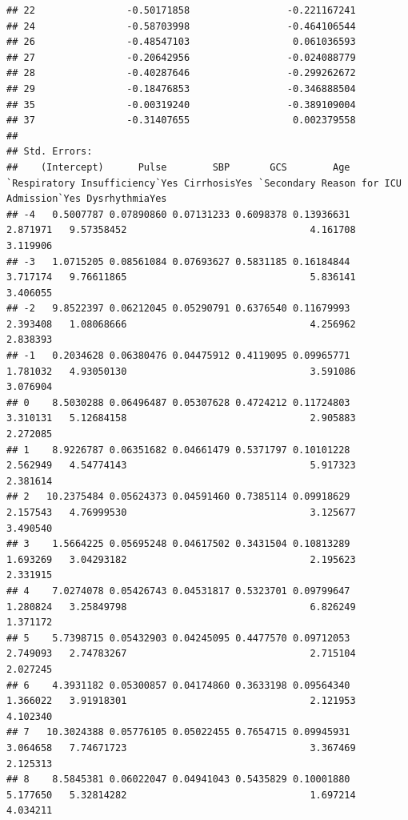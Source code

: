 \documentclass[
]{article}
\begin{document}
\begin{verbatim}
## 22                -0.50171858                 -0.221167241
## 24                -0.58703998                 -0.464106544
## 26                -0.48547103                  0.061036593
## 27                -0.20642956                 -0.024088779
## 28                -0.40287646                 -0.299262672
## 29                -0.18476853                 -0.346888504
## 35                -0.00319240                 -0.389109004
## 37                -0.31407655                  0.002379558
## 
## Std. Errors:
##    (Intercept)      Pulse        SBP       GCS        Age `Respiratory Insufficiency`Yes CirrhosisYes `Secondary Reason for ICU Admission`Yes DysrhythmiaYes
## -4   0.5007787 0.07890860 0.07131233 0.6098378 0.13936631                       2.871971   9.57358452                                4.161708       3.119906
## -3   1.0715205 0.08561084 0.07693627 0.5831185 0.16184844                       3.717174   9.76611865                                5.836141       3.406055
## -2   9.8522397 0.06212045 0.05290791 0.6376540 0.11679993                       2.393408   1.08068666                                4.256962       2.838393
## -1   0.2034628 0.06380476 0.04475912 0.4119095 0.09965771                       1.781032   4.93050130                                3.591086       3.076904
## 0    8.5030288 0.06496487 0.05307628 0.4724212 0.11724803                       3.310131   5.12684158                                2.905883       2.272085
## 1    8.9226787 0.06351682 0.04661479 0.5371797 0.10101228                       2.562949   4.54774143                                5.917323       2.381614
## 2   10.2375484 0.05624373 0.04591460 0.7385114 0.09918629                       2.157543   4.76999530                                3.125677       3.490540
## 3    1.5664225 0.05695248 0.04617502 0.3431504 0.10813289                       1.693269   3.04293182                                2.195623       2.331915
## 4    7.0274078 0.05426743 0.04531817 0.5323701 0.09799647                       1.280824   3.25849798                                6.826249       1.371172
## 5    5.7398715 0.05432903 0.04245095 0.4477570 0.09712053                       2.749093   2.74783267                                2.715104       2.027245
## 6    4.3931182 0.05300857 0.04174860 0.3633198 0.09564340                       1.366022   3.91918301                                2.121953       4.102340
## 7   10.3024388 0.05776105 0.05022455 0.7654715 0.09945931                       3.064658   7.74671723                                3.367469       2.125313
## 8    8.5845381 0.06022047 0.04941043 0.5435829 0.10001880                       5.177650   5.32814282                                1.697214       4.034211

\end{verbatim}
\end{document}
